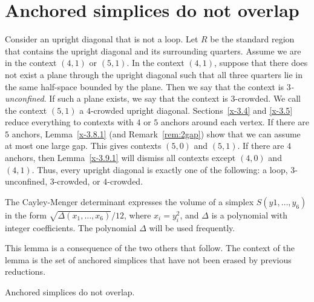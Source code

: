 \section{Anchored simplices do not overlap}



\begin{definition}
Consider an upright diagonal that is not a loop. Let $R$ be the
standard region that contains the upright diagonal and its
surrounding quarters.  Assume we are in the context $(4,1)$ or
$(5,1)$.  In the context $(4,1)$, suppose that there does not
exist a plane through the upright diagonal such that all three
quarters lie in the same half-space bounded by the plane. Then we
say that the context is {\it $3$-unconfined}. If such a plane
exists, we say that the context is $3$-crowded. We call the
context $(5,1)$ a $4$-crowded upright diagonal.
Sections~\ref{x-3.4} and \ref{x-3.5} reduce everything to contexts
with $4$ or $5$ anchors around each vertex.  If there are $5$
anchors, Lemma~\ref{x-3.8.1} (and Remark~\ref{rem:2gap}) show that
we can assume at most one large gap.
 This gives contexts $(5,0)$ and $(5,1)$.  If there are $4$ anchors,
 then Lemma~\ref{x-3.9.1} will dismiss all contexts except $(4,0)$ and
 $(4,1)$.
Thus, every upright diagonal is exactly one of the following: a
loop, $3$-unconfined, $3$-crowded, or $4$-crowded.
\end{definition}

\begin{definition}   The Cayley-Menger determinant
expresses the volume of a simplex $S(y1,\ldots,y_6)$ in the form
$\sqrt{\Delta(x_1,\ldots,x_6)}/12$, where $x_i = y_i^2$, and
$\Delta$ is a polynomial with integer coefficients.  The
polynomial $\Delta$ will be used frequently.
\end{definition}

This lemma is a consequence of the two others that follow. The
context of the lemma is the set of anchored simplices that have
not been erased by previous reductions.

\begin{lemma}
    \label{lemma:anchor-no-overlap}
Anchored simplices do not overlap.
\end{lemma}

